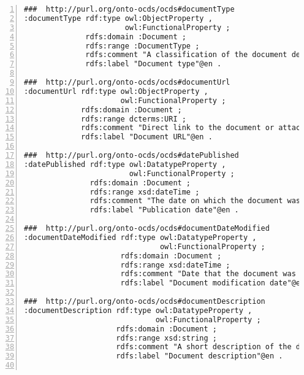 \begin{lstlisting}[captionpos=b, caption={Extracto de código de la ontología OCDSPY}, label={lst:ocdspyAnexo},  numbers=left,  numberstyle=\tiny\color{mygray},frame=single, breaklines=true]
###  http://purl.org/onto-ocds/ocds#documentType
:documentType rdf:type owl:ObjectProperty ,
                       owl:FunctionalProperty ;
              rdfs:domain :Document ;
              rdfs:range :DocumentType ;
              rdfs:comment "A classification of the document described taken from the [documentType codelist](http://standard.open-contracting.org/latest/en/schema/codelists/#document-type). Values from the provided codelist should be used wherever possible, though extended values can be provided if the codelist does not have a relevant code."@en ;
              rdfs:label "Document type"@en .

###  http://purl.org/onto-ocds/ocds#documentUrl
:documentUrl rdf:type owl:ObjectProperty ,
                      owl:FunctionalProperty ;
             rdfs:domain :Document ;
             rdfs:range dcterms:URI ;
             rdfs:comment "Direct link to the document or attachment. The server providing access to this document should be configured to correctly report the document mime type."@en ;
             rdfs:label "Document URL"@en .

###  http://purl.org/onto-ocds/ocds#datePublished
:datePublished rdf:type owl:DatatypeProperty ,
                        owl:FunctionalProperty ;
               rdfs:domain :Document ;
               rdfs:range xsd:dateTime ;
               rdfs:comment "The date on which the document was first published. This is particularly important for legally important documents such as notices of a tender."@en ;
               rdfs:label "Publication date"@en .

###  http://purl.org/onto-ocds/ocds#documentDateModified
:documentDateModified rdf:type owl:DatatypeProperty ,
                               owl:FunctionalProperty ;
                      rdfs:domain :Document ;
                      rdfs:range xsd:dateTime ;
                      rdfs:comment "Date that the document was last modified"@en ;
                      rdfs:label "Document modification date"@en .

###  http://purl.org/onto-ocds/ocds#documentDescription
:documentDescription rdf:type owl:DatatypeProperty ,
                              owl:FunctionalProperty ;
                     rdfs:domain :Document ;
                     rdfs:range xsd:string ;
                     rdfs:comment "A short description of the document. We recommend descriptions do not exceed 250 words. In the event the document is not accessible online, the description field can be used to describe arrangements for obtaining a copy of the document."@en ;
                     rdfs:label "Document description"@en .


\end{lstlisting}
